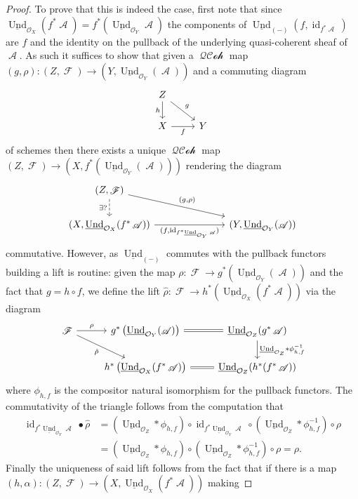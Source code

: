 \documentclass{amsart}
\theoremstyle{definition}
\DeclareMathOperator{\Ascr}{\mathscr{A}}
\DeclareMathOperator{\Fscr}{\mathscr{F}}
\DeclareMathOperator{\Ocal}{\mathcal{O}}
\DeclareMathOperator{\id}{id}
\DeclareMathOperator{\und}{Und}
\newcommand{\RelUnd}[1]{\underline{\und}_{{#1}}}
\DeclareMathOperator{\QQCoh}{\mathcal{QCoh}}
\numberwithin{equation}{subsection}
\begin{document}
\begin{proof}
	To prove that this is indeed the case, first note that since $\RelUnd{\Ocal_X}(f^{\ast}\Ascr) = f^{\ast}(\RelUnd{\Ocal_Y}\Ascr)$ the components of $\RelUnd{(-)}(f,\id_{f^{\ast}\Ascr})$ are $f$ and the identity on the pullback of the underlying quasi-coherent sheaf of $\Ascr$. As such it suffices to show that given a $\QQCoh$ map $(g,\rho):(Z,\Fscr) \to (Y,\RelUnd{\Ocal_Y}(\Ascr))$ and a commuting diagram
	\[
	\begin{tikzcd}
		Z \ar[dr]{}{g} \ar[d, swap]{}{h} \\
		X \ar[r, swap]{}{f} & Y
	\end{tikzcd}
	\]
	of schemes then there exists a unique $\QQCoh$ map $(Z,\Fscr) \to (X,f^{\ast}(\RelUnd{\Ocal_Y}(\Ascr)))$ rendering the diagram
	\[
	\begin{tikzcd}
		(Z,\Fscr) \ar[d, dashed, swap]{}{\exists?} \ar[drrr]{}{(g,\rho)} & & & \\
		(X,\RelUnd{\Ocal_X}(f^{\ast}\Ascr)) \ar[rrr, swap]{}{(f, \id_{f^{\ast}\RelUnd{\Ocal_Y}\Ascr})} & & & (Y,\RelUnd{\Ocal_Y}(\Ascr))
	\end{tikzcd}
	\]
	commutative. However, as $\RelUnd{(-)}$ commutes with the pullback functors building a lift is routine: given the map $\rho:\Fscr \to g^{\ast}(\RelUnd{\Ocal_Y}(\Ascr))$ and the fact that $g = h \circ f$, we define the lift $\hat{\rho}:\Fscr \to h^{\ast}(\RelUnd{\Ocal_X}(f^{\ast}\Ascr))$ via the diagram
	\[
	\begin{tikzcd}
	\Fscr \ar[r]{}{\rho} \ar[dr, swap]{}{\hat{\rho}} & g^{\ast}\left(\RelUnd{\Ocal_Y}(\Ascr)\right) \ar[r, equals] & \RelUnd{\Ocal_Z}(g^{\ast}\Ascr) \ar[d]{}{\RelUnd{\Ocal_Z} \ast \phi_{h,f}^{-1}} \\
	 & h^{\ast}\left(\RelUnd{\Ocal_X}(f^{\ast}\Ascr)\right) & \RelUnd{\Ocal_Z}(h^{\ast}(f^{\ast}\Ascr)) \ar[l, equals]{}{}
	\end{tikzcd}
	\]
	where $\phi_{h,f}$ is the compositor natural isomorphism for the pullback functors. The commutativity of the triangle follows from the computation that
	\begin{align*}
	\id_{f^{\ast}\RelUnd{\Ocal_Y}\Ascr} \bullet \hat{\rho} &= \left(\RelUnd{\Ocal_Z} \ast \phi_{h,f}\right) \circ \id_{f^{\ast}\RelUnd{\Ocal_Y}\Ascr} \circ \left(\RelUnd{\Ocal_Z} \ast \phi_{h,f}^{-1}\right) \circ \rho \\
	&= \left(\RelUnd{\Ocal_Z} \ast \phi_{h,f}\right) \circ \left(\RelUnd{\Ocal_Z} \ast \phi_{h,f}^{-1}\right) \circ \rho = \rho.
	\end{align*}
	Finally the uniqueness of said lift follows from the fact that if there is a map $(h,\alpha):(Z,\Fscr) \to (X,\RelUnd{\Ocal_X}(f^{\ast}\Ascr))$ making

\end{proof}
\end{document}

